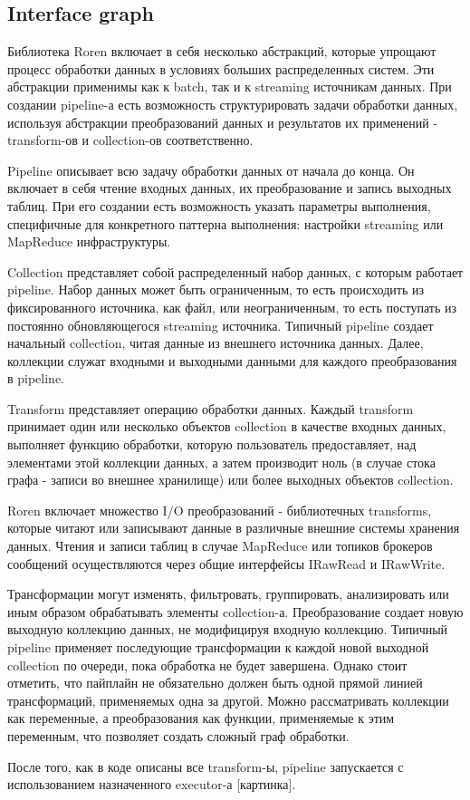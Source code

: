 \subsection{Interface graph}

Библиотека Roren включает в себя несколько абстракций, которые упрощают процесс обработки данных в условиях больших распределенных систем. Эти абстракции применимы как к batch, так и к streaming источникам данных. При создании pipeline-а есть возможность структурировать задачи обработки данных, используя абстракции преобразований данных и результатов их применений - transform-ов и collection-ов соответственно.

Pipeline описывает всю задачу обработки данных от начала до конца. Он включает в себя чтение входных данных, их преобразование и запись выходных таблиц. При его создании есть возможность указать параметры выполнения, специфичные для конкретного паттерна выполнения: настройки streaming или MapReduce инфраструктуры.

Collection представляет собой распределенный набор данных, с которым работает pipeline. Набор данных может быть ограниченным, то есть происходить из фиксированного источника, как файл, или неограниченным, то есть поступать из постоянно обновляющегося streaming источника. Типичный pipeline создает начальный collection, читая данные из внешнего источника данных. Далее, коллекции служат входными и выходными данными для каждого преобразования в pipeline.

Transform представляет операцию обработки данных. Каждый transform принимает один или несколько объектов collection в качестве входных данных, выполняет функцию обработки, которую пользователь предоставляет, над элементами этой коллекции данных, а затем производит ноль (в случае стока графа - записи во внешнее хранилище) или более выходных объектов collection.

Roren включает множество I/O преобразований - библиотечных transforms, которые читают или записывают данные в различные внешние системы хранения данных. Чтения и записи таблиц в случае MapReduce или топиков брокеров сообщений осуществляются через общие интерфейсы IRawRead и IRawWrite.

Трансформации могут изменять, фильтровать, группировать, анализировать или иным образом обрабатывать элементы collection-а. Преобразование создает новую выходную коллекцию данных, не модифицируя входную коллекцию. Типичный pipeline применяет последующие трансформации к каждой новой выходной collection по очереди, пока обработка не будет завершена. Однако стоит отметить, что пайплайн не обязательно должен быть одной прямой линией трансформаций, применяемых одна за другой. Можно рассматривать коллекции как переменные, а преобразования как функции, применяемые к этим переменным, что позволяет создать сложный граф обработки.

После того, как в коде описаны все transform-ы, pipeline запускается с использованием назначенного executor-а [картинка].
